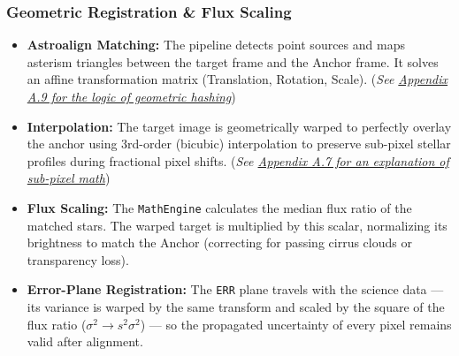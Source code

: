 \documentclass[11pt,a4paper]{article}
\begin{document}
\subsubsection{Geometric Registration \& Flux Scaling}
\begin{itemize}[leftmargin=*]
    \item \textbf{Astroalign Matching:} The pipeline detects point sources and maps asterism triangles between the target frame and the Anchor frame. It solves an affine transformation matrix (Translation, Rotation, Scale). (\textit{See \hyperref[app:astroalign]{Appendix A.9 for the logic of geometric hashing}})
    \item \textbf{Interpolation:} The target image is geometrically warped to perfectly overlay the anchor using 3rd-order (bicubic) interpolation to preserve sub-pixel stellar profiles during fractional pixel shifts. (\textit{See \hyperref[app:interp]{Appendix A.7 for an explanation of sub-pixel math}})
    \item \textbf{Flux Scaling:} The \texttt{MathEngine} calculates the median flux ratio of the matched stars. The warped target is multiplied by this scalar, normalizing its brightness to match the Anchor (correcting for passing cirrus clouds or transparency loss).
    \item \textbf{Error-Plane Registration:} The \texttt{ERR} plane travels with the science data --- its variance is warped by the same transform and scaled by the square of the flux ratio ($\sigma^2 \rightarrow s^2\sigma^2$) --- so the propagated uncertainty of every pixel remains valid after alignment.
\end{itemize}
\end{document}

